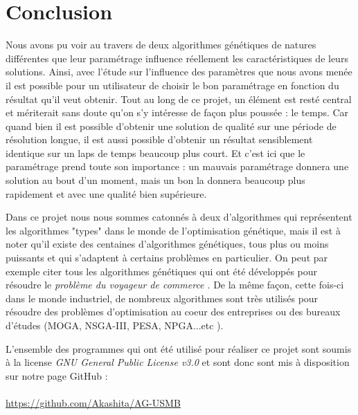 \documentclass[12pt]{report}
\begin{document}
  \chapter{Conclusion}

  Nous avons pu voir au travers de deux algorithmes génétiques de natures différentes que leur paramétrage influence réellement les caractéristiques de leurs solutions. Ainsi, avec l'étude sur l'influence des paramètres que nous avons menée il est possible pour un utilisateur de choisir le bon paramétrage en fonction du résultat qu'il veut obtenir.
  Tout au long de ce projet, un élément est resté central et mériterait sans doute qu'on s'y intéresse de façon plus poussée : le temps. Car quand bien il est possible d'obtenir une solution de qualité sur une période de résolution longue, il est aussi possible d'obtenir un résultat sensiblement identique sur un laps de temps beaucoup plus court. Et c'est ici que le paramétrage prend toute son importance : un mauvais paramétrage donnera une solution au bout d'un moment, mais un bon la donnera beaucoup plus rapidement et avec une qualité bien supérieure.

  Dans ce projet nous nous sommes catonnés à deux d'algorithmes qui représentent les algorithmes "types" dans le monde de l'optimisation génétique, mais il est à noter qu'il existe des centaines d'algorithmes génétiques, tous plus ou moins puissants et qui s'adaptent à certains problèmes en particulier. On peut par exemple citer tous les algorithmes génétiques qui ont été développés pour résoudre le \emph{problème du voyageur de commerce \cite{wiki7}}. De la même façon, cette fois-ci dans le monde industriel, de nombreux algorithmes sont très utilisés pour résoudre des problèmes d'optimisation au coeur des entreprises ou des bureaux d'études (MOGA, NSGA-III, PESA, NPGA...etc \cite{diapo}).


   L'ensemble des programmes qui ont été utilisé pour réaliser ce projet sont soumis à la license \emph{GNU General Public License v3.0} et sont donc sont mis à disposition sur notre page GitHub : \\\\
   \url{https://github.com/Akashita/AG-USMB}

  \appendix

  \nocite{*} %
  
  
\end{document}
